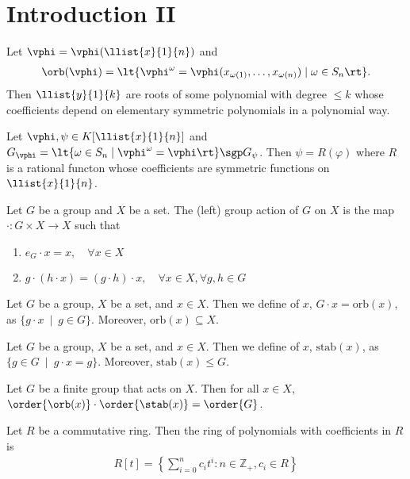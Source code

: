 \documentclass[a4paper]{article}
\begin{document}
\section{Introduction II}
\begin{ttheorem}[Lagrange]
  Let \( \vphi=\vphi(\llist{x}{1}{n}) \) and \begin{align*}
    \orb(\vphi) = \lt\{ \vphi^\omega = \vphi(x_{\omega(1)},\ldots,x_{\omega(n)}) \mid\omega\in S_n \rt\}.
  \end{align*}
  Then \( \llist{y}{1}{k} \) are roots of some polynomial with degree \( \leq k \) whose coefficients depend on elementary symmetric polynomials  in a polynomial way.
\end{ttheorem}

\begin{ttheorem}[Lagrange]
  Let \( \vphi,\psi\in K[\llist{x}{1}{n}] \) and \( G_\vphi=\lt\{ \omega\in S_n \mid \vphi^\omega=\vphi \rt\} \sgp G_\psi \).
  Then \( \psi = R(\varphi) \) where \( R \) is a rational functon whose coefficients are symmetric functions on \( \llist{x}{1}{n} \).
\end{ttheorem}

\begin{tdefinition}
  Let \( G \) be a group and \( X \) be a set. The (left) group action of \( G \) on \( X \) is the map \( \cdot:G\times X\to X \) such that \begin{enumerate}
    \item \( e_G\cdot x = x, \quad \forall x\in X \)
    \item \( g\cdot (h\cdot x)=(g\cdot h)\cdot x,\quad \forall x\in X,\forall g,h\in G \)
  \end{enumerate}
\end{tdefinition}

\begin{tdefinition}[Orbit]
  Let \( G \) be a group, \( X \) be a set, and \( x\in X \).
  Then we define  of \( x \), \( G\cdot x = \text{orb}(x) \), as \( \{g\cdot x \ \mid \ g\in G\} \).
  Moreover, \( \text{orb}(x)\subseteq X \).
\end{tdefinition}

\begin{tdefinition}[Stabilizer]
  Let \( G \) be a group, \( X \) be a set, and \( x\in X \).
  Then we define  of \( x \), \( \text{stab}(x) \), as \( \{g\in G \ \mid \ g\cdot x = g\} \).
  Moreover, \( \text{stab}(x)\leq G \).
\end{tdefinition}

\begin{ttheorem}
  Let \( G \) be a finite group that acts on \( X \). Then for all \( x\in X \), \( \order{\orb(x)} \cdot \order{\stab(x)} = \order{G} \).
\end{ttheorem}

\begin{tdefinition}
  Let \( R \) be a commutative ring. Then the ring of polynomials with coefficients in \( R \) is
  \begin{align*}
    R[t] = \left\{\sum_{i=0}^n c_it^i : n\in\mathbb{Z}_+, c_i\in R\right\}
  \end{align*}
\end{tdefinition}
\end{document}
